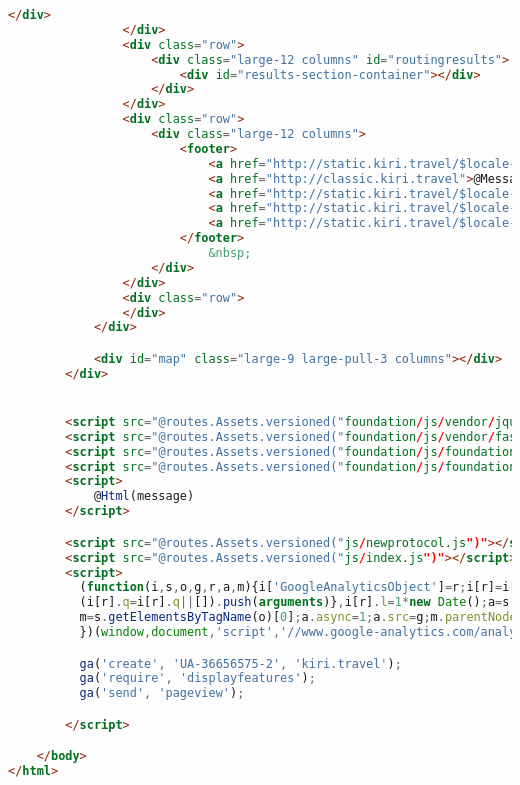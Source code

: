 \begin{lstlisting}[language=HTML,basicstyle=\tiny,caption=index.scala.html]
                    </div>
                </div>
                <div class="row">
                    <div class="large-12 columns" id="routingresults">
                        <div id="results-section-container"></div>
                    </div>
                </div>
                <div class="row">
                    <div class="large-12 columns">
                        <footer>
                            <a href="http://static.kiri.travel/$locale-apps">@Messages.get("apps")</a> |
                            <a href="http://classic.kiri.travel">@Messages.get("old")</a><br/>
                            <a href="http://static.kiri.travel/$locale-legal">@Messages.get("legal")</a> |
                            <a href="http://static.kiri.travel/$locale-feedback">@Messages.get("feedback")</a> |
                            <a href="http://static.kiri.travel/$locale-about">@Messages.get("about")</a>
                        </footer>
                            &nbsp;
                    </div>
                </div>
                <div class="row">
                </div>
            </div>

            <div id="map" class="large-9 large-pull-3 columns"></div>
        </div>


        <script src="@routes.Assets.versioned("foundation/js/vendor/jquery.js")"></script>
        <script src="@routes.Assets.versioned("foundation/js/vendor/fastclick.js")"></script>
        <script src="@routes.Assets.versioned("foundation/js/foundation.min.js")"></script>
        <script src="@routes.Assets.versioned("foundation/js/foundation/foundation.alert.js")"></script>
        <script>
            @Html(message)
        </script>

        <script src="@routes.Assets.versioned("js/newprotocol.js")"></script>
        <script src="@routes.Assets.versioned("js/index.js")"></script>
        <script>
          (function(i,s,o,g,r,a,m){i['GoogleAnalyticsObject']=r;i[r]=i[r]||function(){
          (i[r].q=i[r].q||[]).push(arguments)},i[r].l=1*new Date();a=s.createElement(o),
          m=s.getElementsByTagName(o)[0];a.async=1;a.src=g;m.parentNode.insertBefore(a,m)
          })(window,document,'script','//www.google-analytics.com/analytics.js','ga');

          ga('create', 'UA-36656575-2', 'kiri.travel');
          ga('require', 'displayfeatures');
          ga('send', 'pageview');

	    </script>

    </body>
</html>

\end{lstlisting}
